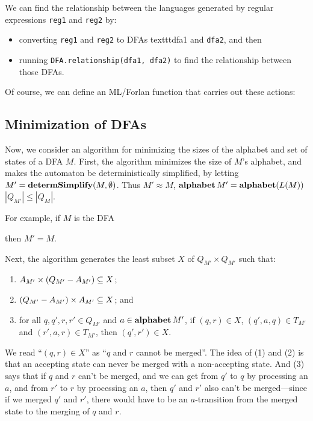 We can find the relationship between the languages generated by regular
expressions \texttt{reg1} and \texttt{reg2} by:
\begin{itemize}
\item  converting \texttt{reg1} and \texttt{reg2} to DFAs
texttt{dfa1} and \texttt{dfa2}, and then

\item  running \texttt{DFA.relationship(dfa1, dfa2)} to find
the relationship between those DFAs.
\end{itemize}

Of course, we can define an ML/Forlan function that
carries out these actions:


\subsection{Minimization of DFAs}

%

Now, we consider an algorithm for minimizing the sizes of the alphabet
and set of states of a DFA $M$.  First, the algorithm minimizes the
size of $M$'s alphabet, and makes the automaton be deterministically
simplified, by letting $M'=\mathbf{determSimplify}(M,\emptyset)$.  Thus
$M'\approx M$, $\mathbf{alphabet}\,M'=\mathbf{alphabet}(L(M))$ $|Q_{M'}|\leq|Q_M|$.

For example, if $M$ is the DFA
\begin{center}

\end{center}
then $M'=M$.

Next, the algorithm generates the least subset $X$ of $Q_{M'}\times
Q_{M'}$ such that:
\begin{enumerate}[\quad(1)]
\item $A_{M'}\times(Q_{M'}-A_{M'})\subseteq X$;

\item $(Q_{M'}-A_{M'})\times A_{M'}\subseteq X$; and

\item for all $q,q',r,r'\in Q_{M'}$ and $a\in\mathbf{alphabet}\,M'$,
if $(q,r)\in X$, $(q',a, q)\in T_{M'}$ and $(r',a, r)\in T_{M'}$, then
$(q',r')\in X$.
\end{enumerate}
We read ``$(q,r)\in X$'' as ``$q$ and $r$ cannot be merged''.
The idea of (1) and (2) is that an accepting state can never be merged
with a non-accepting state.  And (3) says that if $q$ and $r$ can't
be merged, and we can get from $q'$ to $q$ by processing an $a$, and
from $r'$ to $r$ by processing an $a$, then
$q'$ and $r'$ also can't be merged---since if we merged $q'$ and $r'$,
there would have to be an $a$-transition from the merged state
to the merging of $q$ and $r$.

